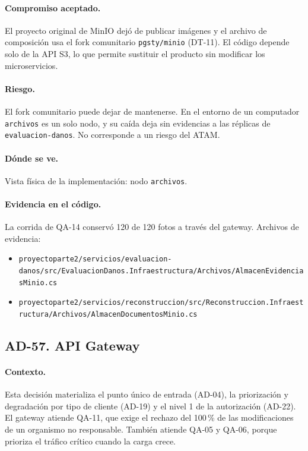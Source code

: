 \paragraph{Compromiso aceptado.} El proyecto original de MinIO dejó de publicar imágenes y el archivo de composición usa el fork comunitario \texttt{pgsty/minio} (DT-11).
El código depende solo de la API S3, lo que permite sustituir el producto sin modificar los microservicios.

\paragraph{Riesgo.} El fork comunitario puede dejar de mantenerse.
En el entorno de un computador \texttt{archivos} es un solo nodo, y su caída deja sin evidencias a las réplicas de \texttt{evaluacion-danos}.
No corresponde a un riesgo del ATAM.

\paragraph{Dónde se ve.} Vista física de la implementación: nodo \texttt{archivos}.

\paragraph{Evidencia en el código.} La corrida de QA-14 conservó 120 de 120 fotos a través del gateway.
Archivos de evidencia:
{\raggedright
\begin{itemize}
  \item \texttt{proyectoparte2/\br{}servicios/\br{}evaluacion-danos/\br{}src/\br{}EvaluacionDanos.Infraestructura/\br{}Archivos/\br{}AlmacenEvidenciasMinio.cs}
  \item \texttt{proyectoparte2/\br{}servicios/\br{}reconstruccion/\br{}src/\br{}Reconstruccion.Infraestructura/\br{}Archivos/\br{}AlmacenDocumentosMinio.cs}
\end{itemize}
\par}

\subsection{AD-57. API Gateway}
\label{sec:tec-ad57}

\paragraph{Contexto.} Esta decisión materializa el punto único de entrada (AD-04), la priorización y degradación por tipo de cliente (AD-19) y el nivel 1 de la autorización (AD-22).
El gateway atiende QA-11, que exige el rechazo del 100\,\% de las modificaciones de un organismo no responsable.
También atiende QA-05 y QA-06, porque prioriza el tráfico crítico cuando la carga crece.

